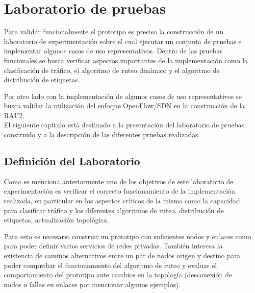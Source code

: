 \chapter{Laboratorio de pruebas}
\label{chapter6}

\ifpdf
    \graphicspath{{Chapter6/Figs/Raster/}{Chapter6/Figs/PDF/}{Chapter6/Figs/}}
\else
    \graphicspath{{Chapter6/Figs/Vector/}{Chapter6/Figs/}}
\fi

Para validar funcionalmente el prototipo es preciso la construcción de un laboratorio de experimentación sobre el cual ejecutar un conjunto de pruebas e implementar algunos casos de uso representativos. Dentro de las pruebas funcionales se busca verificar aspectos importantes de la implementaci\'on como la clasificación de tr\'afico, el algoritmo de ruteo dinámico y el algoritmo de distribución de etiquetas.

Por otro lado con la implementaci\'on de algunos casos de uso representativos se busca validar la utilización del enfoque OpenFlow/SDN en la construcci\'on de la RAU2.\\

El siguiente cap\'itulo est\'a destinado a la presentación del laboratorio de pruebas construido y a la descripción de las diferentes pruebas realizadas.

\section{Definición del Laboratorio}

Como se menciona anteriormente uno de los objetivos de este laboratorio de experimentaci\'on es verificar el correcto funcionamiento de la implementaci\'on realizada, en particular en los aspectos críticos de la misma como la capacidad para clasificar tr\'afico y los diferentes algoritmos de ruteo, distribución de etiquetas, actualización topol\'ogica. 

Para esto es necesario construir un prototipo con suficientes nodos y enlaces como para poder definir varios servicios de redes privadas. Tambi\'en interesa la existencia de caminos alternativos entre un par de nodos origen y destino para poder comprobar el funcionamiento del algoritmo de ruteo y evaluar el comportamiento del prototipo ante cambios en la topolog\'ia (desconexi\'on de nodos o fallas en enlaces por mencionar algunos ejemplos).

